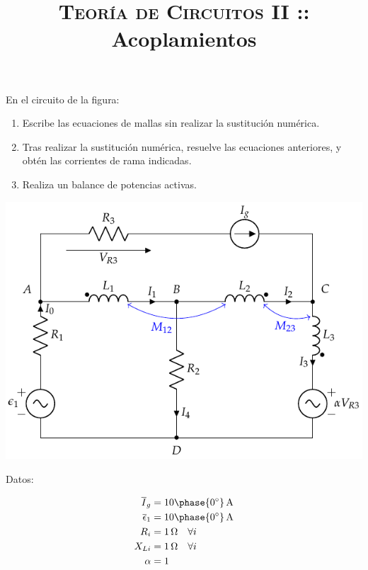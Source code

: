 \documentclass[12pt]{article}
\begin{document}
\title{\textsc{Teoría de Circuitos II} :: Acoplamientos}

\date{}

\maketitle
En el circuito de la figura:
\begin{enumerate}
\item Escribe las ecuaciones de mallas sin realizar la sustitución numérica.
\item Tras realizar la sustitución numérica, resuelve las ecuaciones anteriores, y obtén las corrientes de rama indicadas.
\item Realiza un balance de potencias activas.
\end{enumerate}

\begin{center}
  \includegraphics[height=0.4\textheight]{figs/acoplamientos.pdf}
\end{center}

Datos:

\begin{align*}
  \overline{I}_g &= \SI[parse-numbers=false]{10\phase{\ang{0}}}{\ampere}\\
  \overline{\epsilon}_1 &= \SI[parse-numbers=false]{10\phase{\ang{0}}}{\ampere}\\
  R_i &= \SI{1}{\ohm} \quad \forall i\\
  X_{Li} &= \SI{1}{\ohm} \quad \forall i\\
  \alpha &= 1\\
\end{align*}
\end{document}
